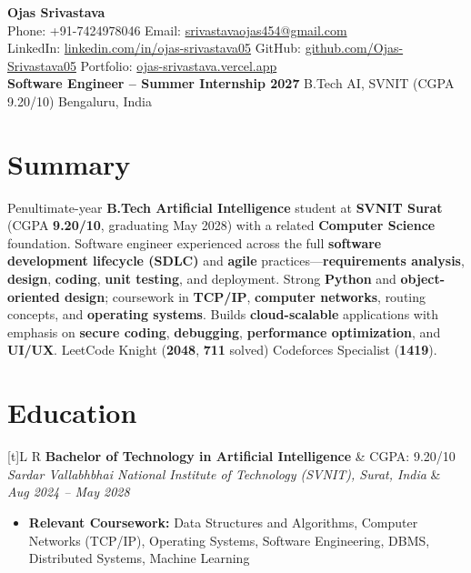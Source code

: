 \documentclass[a4paper,10pt]{article}
\newcommand{\resumeSubheading}[4]{
  \vspace{0.5mm}
  \noindent
  \begin{tabularx}{\textwidth}[t]{L R}
    \textbf{#1} & #4 \\
    \textit{#3} & \textit{#2} \\
  \end{tabularx}
  \vspace{-0.5mm}
}
\begin{document}
\selectfont

\begin{center}
  {\LARGE \textbf{Ojas Srivastava}} \\[1mm]
  \small
  Phone: +91-7424978046 \textbar{}
  Email: \href{mailto:srivastavaojas454@gmail.com}{srivastavaojas454@gmail.com} \\[0.5mm]
  LinkedIn: \href{https://linkedin.com/in/ojas-srivastava05}{linkedin.com/in/ojas-srivastava05} \textbar{}
  GitHub: \href{https://github.com/Ojas-Srivastava05}{github.com/Ojas-Srivastava05} \textbar{}
  Portfolio: \href{https://ojas-srivastava.vercel.app}{ojas-srivastava.vercel.app} \\[0.5mm]
  \textbf{Software Engineer -- Summer Internship 2027} \textbar{} B.Tech AI, SVNIT (CGPA 9.20/10) \textbar{} Bengaluru, India
\end{center}

\vspace{-1mm}

\section{Summary}
\small
Penultimate-year \textbf{B.Tech Artificial Intelligence} student at \textbf{SVNIT Surat} (CGPA \textbf{9.20/10}, graduating May 2028) with a related \textbf{Computer Science} foundation. Software engineer experienced across the full \textbf{software development lifecycle (SDLC)} and \textbf{agile} practices---\textbf{requirements analysis}, \textbf{design}, \textbf{coding}, \textbf{unit testing}, and deployment. Strong \textbf{Python} and \textbf{object-oriented design}; coursework in \textbf{TCP/IP}, \textbf{computer networks}, routing concepts, and \textbf{operating systems}. Builds \textbf{cloud-scalable} applications with emphasis on \textbf{secure coding}, \textbf{debugging}, \textbf{performance optimization}, and \textbf{UI/UX}. LeetCode Knight (\textbf{2048}, \textbf{711} solved) \textbar{} Codeforces Specialist (\textbf{1419}).

\section{Education}
\small
\resumeSubheading
  {Bachelor of Technology in Artificial Intelligence}{Aug 2024 -- May 2028}
  {Sardar Vallabhbhai National Institute of Technology (SVNIT), Surat, India}{CGPA: 9.20/10}
\begin{itemize}
  \item \textbf{Relevant Coursework:} Data Structures and Algorithms, Computer Networks (TCP/IP), Operating Systems, Software Engineering, DBMS, Distributed Systems, Machine Learning
\end{itemize}
\end{document}

